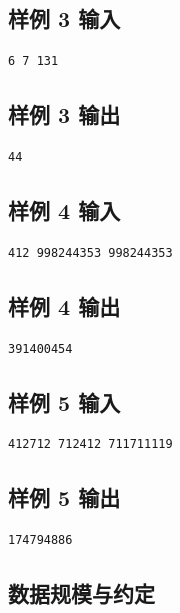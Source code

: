 \documentclass[12pt,a4paper,oneside]{ctexart}
\begin{document}
  \subsection*{样例 3 输入}
  \begin{verbatim}
6 7 131
\end{verbatim}
  \subsection*{样例 3 输出}
  \begin{verbatim}
44
\end{verbatim}
  \subsection*{样例 4 输入}
  \begin{verbatim}
412 998244353 998244353
\end{verbatim}
  \subsection*{样例 4 输出}
  \begin{verbatim}
391400454
\end{verbatim}
  \subsection*{样例 5 输入}
  \begin{verbatim}
412712 712412 711711119
\end{verbatim}
  \subsection*{样例 5 输出}
  \begin{verbatim}
174794886
\end{verbatim}

  \subsection*{数据规模与约定}
\end{document}

